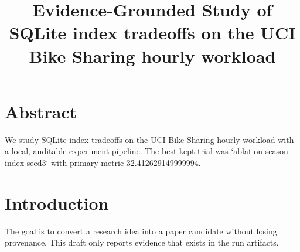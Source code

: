 \documentclass{article}
\begin{document}
\title{Evidence-Grounded Study of SQLite index tradeoffs on the UCI Bike Sharing hourly workload}
\maketitle

\section{Abstract}
We study SQLite index tradeoffs on the UCI Bike Sharing hourly workload with a local, auditable experiment pipeline. The best kept trial was `ablation-season-index-seed3` with primary metric 32.412629149999994.

\section{Introduction}
The goal is to convert a research idea into a paper candidate without losing provenance.
This draft only reports evidence that exists in the run artifacts.
\end{document}
